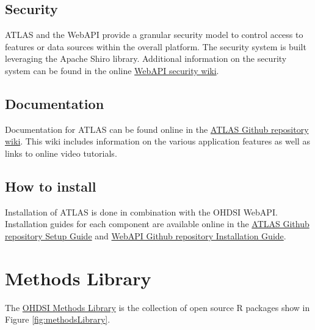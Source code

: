 \documentclass[11pt]{book}
\theoremstyle{definition}
\theoremstyle{definition}
\theoremstyle{definition}
\theoremstyle{remark}
\begin{document}
\hypertarget{security}{%
\subsection{Security}\label{security}}

ATLAS and the WebAPI provide a granular security model to control access to features or data sources within the overall platform. The security system is built leveraging the Apache Shiro library. Additional information on the security system can be found in the online \href{https://github.com/OHDSI/WebAPI/wiki/Security-Configuration}{WebAPI security wiki}. 

\hypertarget{documentation}{%
\subsection{Documentation}\label{documentation}}

Documentation for ATLAS can be found online in the \href{https://github.com/OHDSI/ATLAS/wiki}{ATLAS Github repository wiki}. This wiki includes information on the various application features as well as links to online video tutorials. 

\hypertarget{how-to-install}{%
\subsection{How to install}\label{how-to-install}}

Installation of ATLAS is done in combination with the OHDSI WebAPI. Installation guides for each component are available online in the \href{https://github.com/OHDSI/Atlas/wiki/Atlas-Setup-Guide}{ATLAS Github repository Setup Guide} and \href{https://github.com/OHDSI/WebAPI/wiki/WebAPI-Installation-Guide}{WebAPI Github repository Installation Guide}. 

\hypertarget{methods-library}{%
\section{Methods Library}\label{methods-library}}

The \href{https://ohdsi.github.io/MethodsLibrary/}{OHDSI Methods Library} is the collection of open source R packages show in Figure \ref{fig:methodsLibrary}. 
\end{document}
